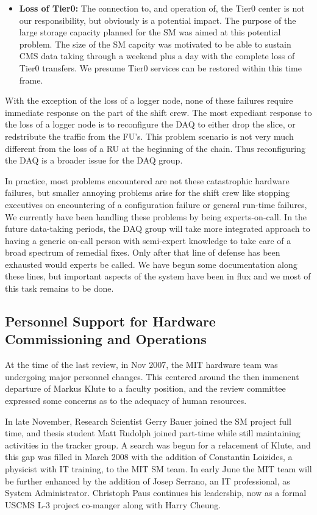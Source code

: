 \begin{itemize}
\item {\bf Loss of Tier0:} The connection to, and operation of, the Tier0 center
is not our responsibility, but obviously is a potential impact.
The purpose of the large storage capacity planned for the SM was
aimed at this potential problem.
The size of the SM capcity was motivated to be able to sustain CMS data taking
through a weekend plus a day with the complete loss of Tier0 transfers.
We presume Tier0 services can be restored within this time frame.
\end{itemize}

With the exception of the loss of a logger node, none of these failures
require immediate response on the part of the shift crew.
The most expediant response to the loss of a logger node is
to reconfigure the DAQ to either drop the slice, 
or redstribute the traffic from the FU's.
This problem scenario is not very much different from the loss of a RU
at the beginning of the chain.
Thus reconfiguring the DAQ is a broader issue for the DAQ group.


In practice, most problems encountered are not these catastrophic hardware failures,
but smaller annoying problems arise for the shift crew like stopping executives on 
encountering of a configuration failure or general run-time failures,
We currently have been handling these problems by being experts-on-call.
In the future data-taking periods, the DAQ group will take more integrated
approach to having a generic on-call person with semi-expert knowledge to take 
care of a broad spectrum of remedial fixes.
Only after that line of defense has been exhausted would experts be called.
We have begun some documentation along these lines, but important
aspects of the system have been in flux and we most of this task
remains to be done.


\subsection{Personnel Support for Hardware Commissioning and Operations}

At the time of the last review, in Nov 2007, the MIT hardware team 
was undergoing major personnel changes.
This centered around the then immenent departure of Markus Klute
to a faculty position, and the review committee expressed
some concerns as to the adequacy of human resources.


In late November, Research Scientist Gerry Bauer joined the SM project
full time, and thesis student Matt Rudolph joined part-time while still maintaining
activities in the tracker group.
A search was begun for a relacement of Klute, and this gap was
filled in March 2008 with the addition of Constantin Loizides,
a physicist with IT training, to the  MIT SM team. 
In early June the MIT team will be further enhanced by the addition
of Josep Serrano, an IT professional, as System Administrator.
Christoph Paus continues his leadership, now as a formal USCMS 
L-3 project co-manger along with Harry Cheung.

